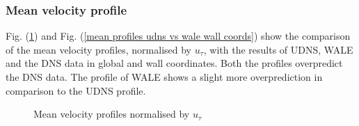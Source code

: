\subsubsection{Mean velocity profile}
Fig. (\ref{mean profiles udns vs wale global coords}) and Fig. (\ref{mean profiles udns vs wale wall coords}) show the comparison of the mean velocity profiles, normalised by $u_\tau$, with the results of UDNS, WALE and the DNS data in global and wall coordinates. Both the profiles overpredict the DNS data. The profile of WALE shows a slight more overprediction in comparison to the UDNS profile.
%
\begin{figure}[h!]
\begin{minipage}[b]{0.5\textwidth}
\end{minipage}
%
\begin{minipage}[b]{0.5\textwidth}
\end{minipage}
\caption{Mean velocity profiles normalised by $u_\tau$}
\label{mean profiles udns vs wale global coords}
\end{figure} 
%

